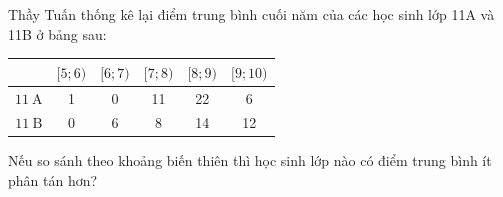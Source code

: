 \begin{bt}[Mức độ 3]%
Thầy Tuấn thống kê lại điểm trung bình cuối năm của các học sinh lớp 11A và 11B ở bảng sau:
\begin{center}
	\begin{tabular}{|c|c|c|c|c|c|}
		\hline \diagbox {Lớp}{Điểm trung bình} & {$[5 ; 6)$} & {$[6 ; 7)$} & {$[7 ; 8)$} & {$[8 ; 9)$} & {$[9 ; 10)$} \\
		\hline $11 \mathrm{~A}$ & 1 & 0 & 11 & 22 & 6 \\
		\hline $11 \mathrm{~B}$ & 0 & 6 & 8 & 14 & 12 \\
		\hline
	\end{tabular}
\end{center}
Nếu so sánh theo khoảng biến thiên thì học sinh lớp nào có điểm trung bình ít phân tán hơn?
\end{bt}

